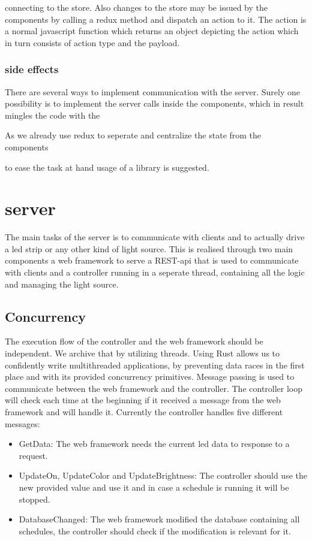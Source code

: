\documentclass[conference]{IEEEtran}
\begin{document}
connecting to the store. Also changes to the store may be issued by the components by calling a redux method and dispatch an action to it.
The action is a normal javascript function which returns an object depicting the action which in turn consists of action type and the payload.

\subsubsection{side effects}
There are several ways to implement communication with the server. Surely one possibility is to implement the server calls inside the components,
which in result mingles the code with the 


As we already use redux to seperate and centralize the state from the components


to ease the task at hand usage of a library is suggested. 



\section{server}

The main tasks of the server is to communicate with clients and to actually drive a led strip or any other kind of light source. This is realised through two main components a web framework to serve a REST-api that is used to communicate with clients and a controller running in a seperate thread, containing all the logic and managing the light source.

\subsection{Concurrency}

The execution flow of the controller and the web framework should be independent. We archive that by utilizing threads. Using Rust allows us to confidently write multithreaded applications\cite{rust:con}, by preventing data races in the first place and with its provided concurrency primitives.
Message passing is used to communicate between the web framework and the controller. The controller loop will check each time at the beginning if it received a message from the web framework and will handle it. Currently the controller handles five different messages:
\begin{itemize}
    \item GetData:
    The web framework needs the current led data to response to a request.
    \item UpdateOn, UpdateColor and UpdateBrightness:
    The controller should use the new provided value and use it and in case a schedule is running it will be stopped.
    \item DatabaseChanged:
    The web framework modified the database containing all schedules, the controller should check if the modification is relevant for it.
\end{itemize}
\end{document}
